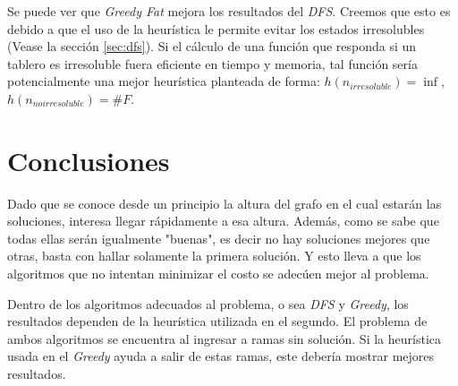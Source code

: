 \documentclass[a4paper,10pt]{article}
\begin{document}
    Se puede ver que \textit{Greedy Fat} mejora los resultados del \textit{DFS}.
    Creemos que esto es debido a que el uso de la heurística le permite evitar los estados irresolubles (Vease la sección \ref{sec:dfs}).
    Si el cálculo de una función que responda si un tablero es irresoluble fuera eficiente en tiempo y memoria, tal función sería potencialmente una mejor heurística 
    planteada de forma: $h(n_{irresoluble}) = \inf$, $h(n_{no irresoluble}) = \#F$.

\section{Conclusiones}
    Dado que se conoce desde un principio la altura del grafo en el cual estarán las soluciones, interesa llegar rápidamente a esa altura.
    Además, como se sabe que todas ellas serán igualmente "buenas", es decir no hay soluciones mejores que otras, basta con hallar solamente la primera solución.
    Y esto lleva a que los algoritmos que no intentan minimizar el costo se adecúen mejor al problema.

    Dentro de los algoritmos adecuados al problema, o sea \textit{DFS} y \textit{Greedy}, los resultados dependen de la heurística utilizada en el segundo.
    El problema de ambos algoritmos se encuentra al ingresar a ramas sin solución.
    Si la heurística usada en el \textit{Greedy} ayuda a salir de estas ramas, este debería mostrar mejores resultados.


\end{document}
